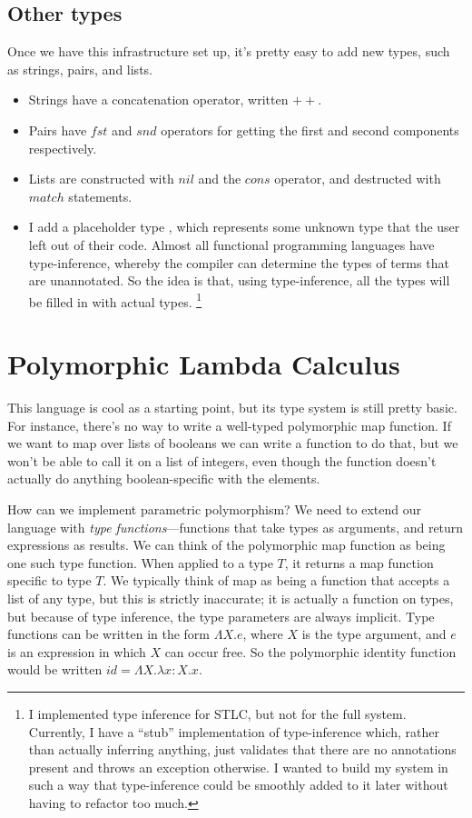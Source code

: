 \documentclass[pageno]{jpaper}
\begin{document}
{\subsection{Other types}
Once we have this infrastructure set up, it's pretty easy to add new types, such as strings, pairs, and lists.
\begin{itemize}
\item Strings have a concatenation operator, written $++$.
\item Pairs have $fst$ and $snd$ operators for getting the first and second components respectively.
\item Lists are constructed with $nil$ and the $cons$ operator, and destructed with $match$ statements.
\item I add a placeholder type , which represents some unknown type that the user
left out of their code. Almost all functional
programming languages have type-inference, whereby the compiler can determine the types of terms that
are unannotated. So the idea is that, using type-inference, all the  types will be filled
in with actual types. \footnote{I implemented type inference for STLC, but not for the full system. Currently,
I have a ``stub'' implementation of type-inference which, rather than actually inferring anything, just
validates that there are no  annotations present and throws an exception otherwise. I wanted
to build my system in such a way that type-inference could be smoothly added to it later without having to
refactor too much.}
\end{itemize}

\section{Polymorphic Lambda Calculus}
This language is cool as a starting point, but its type system is still pretty basic.
For instance, there's no way to write a well-typed polymorphic map function. If we want to map over lists of
booleans we can write a function to do that, but we won't be able to call it on a list of integers,
even though the function doesn't actually do anything boolean-specific with the elements.

How can we implement parametric polymorphism? We need to extend our language with \textit{type functions}---functions that take types as arguments, and return expressions as results. 
We can think of the polymorphic map function as being one such type function. When applied to a type $T$, it
returns a map function specific to type $T$.
We typically think of map as being a function that accepts a list of any type, but this is strictly
inaccurate; it is actually a function on types, but because of type inference, the type parameters are
always implicit. Type functions can be written in the form $\Lambda X.e$, where $X$ is the type argument,
and $e$ is an expression in which $X$ can occur free. So the polymorphic identity function would be
written $id = \Lambda X.\lambda x:X.x$.

}
\end{document}

